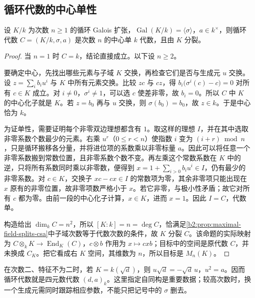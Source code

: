 \subsection{循环代数的中心单性}
\label{b2:subsec:1802:02}

\begin{theorem}\label{b2:thm:cyclic-algebra-central-simple}
	设 \(K/k\) 为次数 \(n\geq1\) 的循环 Galois 扩张，\(\operatorname{Gal}(K/k)=\langle\sigma\rangle\)，\(a\in k^\times\)，则循环代数 \(C=(K/k,\sigma,a)\) 是次数 \(n\) 的中心单 \(k\) 代数，且由 \(K\) 分裂。
\end{theorem}
\begin{proof}
	当 \(n=1\) 时 \(C=k\)，结论直接成立。以下设 \(n\ge2\)。

	要确定中心，先找出哪些元素与子域 \(K\) 交换，再检查它们是否与生成元 \(u\) 交换。设 \(z=\sum_i b_i u^i\) 与 \(K\) 中所有元素交换。比较 \(zc\) 与 \(cz\)，得 \(b_i\bigl(\sigma^i(c)-c\bigr)=0\) 对所有 \(c\in K\) 成立。对 \(i\ne0\)，\(\sigma^i\ne1\)，可以选 \(c\) 使差非零，故 \(b_i=0\)。所以 \(C\) 中 \(K\) 的中心化子就是 \(K\)。若 \(z=b_0\) 再与 \(u\) 交换，则 \(\sigma(b_0)=b_0\)，故 \(z\in k\)。于是中心恰为 \(k\)。

	为证单性，需要证明每个非零双边理想都含有 \(1\)。取这样的理想 \(I\)，并在其中选取非零系数个数最少的元素。右乘 \(u^r\)（\(0\le r<n\)）使指数 \(i\) 变为 \((i+r)\bmod n\)，只是循环搬移各分量，并将进位项的系数乘以非零标量 \(a\)。因此可以将任意一个非零系数搬到常数位置，且非零系数个数不变。再左乘这个常数系数在 \(K\) 中的逆，只将所有系数同时乘以非零数，便得到 \(x=1+\sum_{i>0}b_i u^i\in I\)，仍有最少的非零系数。对 \(c\in K\)，交换子 \(xc-cx\in I\) 的常数项为零，其余非零项只能出现在 \(x\) 原有的非零位置，故非零项数严格小于 \(x\)。若它非零，与极小性矛盾；故它对所有 \(c\) 都为零。由前一段的中心化子计算，\(x\in K\)，进而 \(x=1\)。因此 \(I=C\)，代数单。

	构造给出 \(\dim_kC=n^2\)，所以 \([K:k]=n=\deg C\)，恰满足\cref{b2:prop:maximal-field-splits-csa}中子域次数等于代数次数的条件，故 \(K\) 分裂 \(C\)。该命题的实际映射为 \(C\otimes_kK\to\operatorname{End}_K(C)\)，\(c\otimes b\) 作用为 \(x\mapsto cxb\)；目标中的空间是原代数 \(C\)，并未换成 \(C_K\)。把它看成右 \(K\) 空间，其维数为 \(n\)，所以目标是 \(M_n(K)\)。
\end{proof}

在次数二、特征不为二时，若 \(K=k(\sqrt d)\)，则 \(u\sqrt d=-\sqrt d\,u\)，\(u^2=a\)。因而循环代数就是四元数代数 \((d,a)_k\)。这里指定自同构是重要数据；较高次数时，换一个生成元需同时跟踪相应参数，不能只把记号中的 \(\sigma\) 删去。

